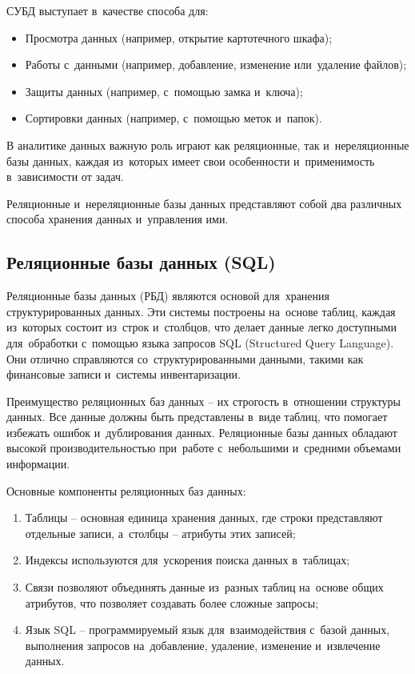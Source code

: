 \documentclass{ou}
\begin{document}
СУБД выступает в~качестве способа для:
\begin{itemize}[label=-, itemindent=4em, nosep]
\item Просмотра данных (например, открытие картотечного шкафа);
\item Работы с~данными (например, добавление, изменение или~удаление файлов);
\item Защиты данных (например, с~помощью замка и~ключа);
\item Сортировки данных (например, с~помощью меток и~папок).
\end{itemize}

В аналитике данных важную роль играют как реляционные, так и~нереляционные базы данных, каждая из~которых имеет свои особенности и~применимость в~зависимости от задач.

Реляционные и~нереляционные базы данных представляют собой два различных способа хранения данных и~управления ими.

\subsection{Реляционные базы данных (SQL)}
Реляционные базы данных (РБД) являются основой для~хранения структурированных данных. Эти системы построены на~основе таблиц, каждая из~которых состоит из~строк и~столбцов, что делает данные легко доступными для~обработки с~помощью языка запросов SQL (Structured Query Language). Они отлично справляются со~структурированными данными, такими как финансовые записи и~системы инвентаризации.

Преимущество реляционных баз данных -- их строгость в~отношении структуры данных. Все данные должны быть представлены в~виде таблиц, что помогает избежать ошибок и~дублирования данных. Реляционные базы данных обладают высокой производительностью при~работе с~небольшими и~средними объемами информации.

Основные компоненты реляционных баз данных:
\begin{enumerate}[itemindent=4em, nosep, label=\arabic*)]
\item Таблицы -- основная единица хранения данных, где строки представляют отдельные записи, а~столбцы -- атрибуты этих записей;
\item Индексы используются для~ускорения поиска данных в~таблицах;
\item Связи позволяют объединять данные из~разных таблиц на~основе общих атрибутов, что позволяет создавать более сложные запросы;
\item Язык SQL -- программируемый язык для~взаимодействия с~базой данных, выполнения запросов на~добавление, удаление, изменение и~извлечение данных.
\end{enumerate}
\end{document}
